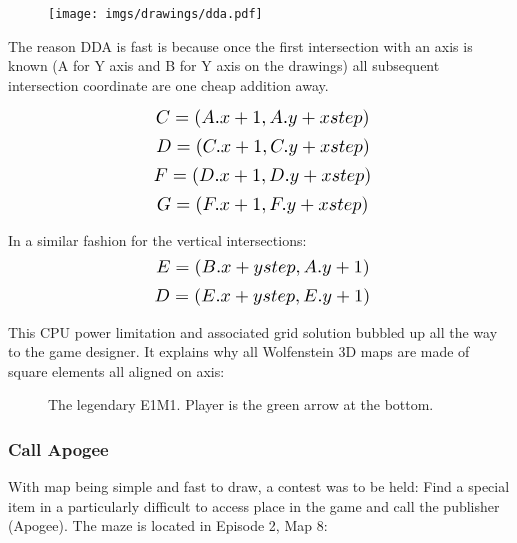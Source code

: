  \par
\begin{figure}[H]
  \centering
 \texttt{[image: imgs/drawings/dda.pdf]}
\end{figure}
\par
The reason DDA is fast is because once the first intersection with an axis is known (A for Y axis and B for Y axis on the drawings) all subsequent intersection coordinate are one cheap addition away.
\par


\begin{equation*}
    \scalebox{1.3}{
$C = (A.x +1, A.y + xstep)$\\
}
\end{equation*}
\begin{equation*}
    \scalebox{1.3}{
$D = (C.x +1, C.y + xstep)$\\
}
\end{equation*}
\begin{equation*}
    \scalebox{1.3}{
$F = (D.x +1, D.y + xstep)$\\
}
\end{equation*}
\begin{equation*}
    \scalebox{1.3}{
$G = (F.x +1, F.y + xstep)$\\
}
\end{equation*}



In a similar fashion for the vertical intersections:\\
  \begin{equation*}
    \scalebox{1.3}{

$E = (B.x + ystep, A.y + 1)$\\
}
\end{equation*}
  \begin{equation*}
    \scalebox{1.3}{
$D = (E.x + ystep, E.y + 1)$\\
}
\end{equation*}

This CPU power limitation and associated grid solution bubbled up all the way to the game designer. It explains why all Wolfenstein 3D maps are made of square elements all aligned on axis:\\
\par
\begin{figure}[H]
  \centering
 \caption{The legendary E1M1. Player is the green arrow at the bottom.}
\end{figure}


\subsubsection{Call Apogee}
With map being simple and fast to draw, a contest was to be held: Find a special item in a particularly difficult to access place in the game and call the publisher (Apogee). The maze is located in Episode 2, Map 8:\\
\par
\begin{figure}[H]
  \centering
\end{figure}

